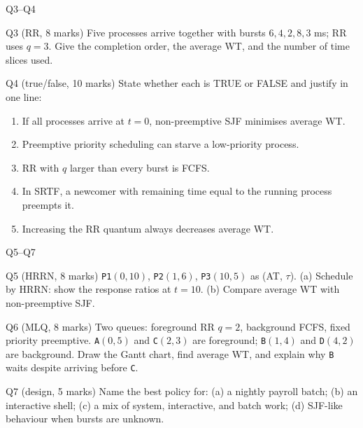 \documentclass[aspectratio=169]{beamer}
\begin{document}
\begin{frame}{Q3--Q4}
  \begin{block}{Q3 \normalfont (RR, 8 marks)}
    Five processes arrive together with bursts $6,4,2,8,3$ ms; RR uses
    $q=3$. Give the completion order, the average WT, and the number of
    time slices used.
  \end{block}
  \begin{block}{Q4 \normalfont (true/false, 10 marks)}
    State whether each is TRUE or FALSE and justify in one line:
    \begin{enumerate}
      \item[(i)] If all processes arrive at $t=0$, non-preemptive SJF
        minimises average WT.
      \item[(ii)] Preemptive priority scheduling can starve a low-priority
        process.
      \item[(iii)] RR with $q$ larger than every burst is FCFS.
      \item[(iv)] In SRTF, a newcomer with remaining time equal to the
        running process preempts it.
      \item[(v)] Increasing the RR quantum always decreases average WT.
    \end{enumerate}
  \end{block}
\end{frame}

\begin{frame}{Q5--Q7}
  \begin{block}{Q5 \normalfont (HRRN, 8 marks)}
    \texttt{P1}$(0,10)$, \texttt{P2}$(1,6)$, \texttt{P3}$(10,5)$ as
    (AT, $\tau$). (a) Schedule by HRRN: show the response ratios at $t=10$.
    (b) Compare average WT with non-preemptive SJF.
  \end{block}
  \begin{block}{Q6 \normalfont (MLQ, 8 marks)}
    Two queues: foreground RR $q=2$, background FCFS, fixed priority
    preemptive. \texttt{A}$(0,5)$ and \texttt{C}$(2,3)$ are foreground;
    \texttt{B}$(1,4)$ and \texttt{D}$(4,2)$ are background. Draw the Gantt
    chart, find average WT, and explain why \texttt{B} waits despite
    arriving before \texttt{C}.
  \end{block}
  \begin{block}{Q7 \normalfont (design, 5 marks)}
    Name the best policy for: (a) a nightly payroll batch; (b) an
    interactive shell; (c) a mix of system, interactive, and batch work;
    (d) SJF-like behaviour when bursts are unknown.
  \end{block}
\end{frame}
\end{document}
